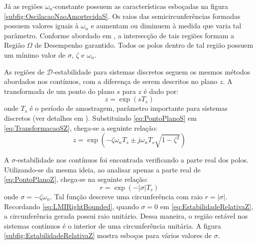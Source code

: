 Já as regiões $\omega_n$-constante possuem as características esboçadas na figura \ref{subfig:OscilacaoNaoAmortecidaS}. Os raios das semicircunferências formadas possuem valores iguais à $\omega_n$ e aumentam ou diminuem à medida que varia tal parâmetro. Conforme abordado em \cite{CHILALI1996}, a intersecção de tais regiões formam a Região $\Omega$ de Desempenho garantido. Todos os polos dentro de tal região possuem um mínimo valor de $\sigma$, $\zeta$ e $\omega_n$.

As regiões de $\mathscr{D}$-estabilidade para sistemas discretos seguem os mesmos métodos abordados nos contínuos, com a diferença de serem descritos no plano $z$. A transformada de um ponto do plano $s$ para $z$ é dado por:
\begin{equation}
  z = \exp(sT_s)\label{eq:TransformacaoSZ}
\end{equation}
onde $T_s$ é o período de amostragem, parâmetro importante para sistemas discretos (ver detalhes em \cite{KUO1980}). Substituindo \eqref{eq:PontoPlanoS} em \eqref{eq:TransformacaoSZ}, chega-se a seguinte relação:
\begin{equation}
  z = \exp{\left(-\zeta\omega_nT_s \pm j\omega_nT_s\sqrt{1-\zeta^2}\right)}\label{eq:PontoPlanoZ}
\end{equation}

A $\sigma$-estabilidade nos contínuos foi encontrada verificando a parte real dos polos. Utilizando-se da mesma ideia, ao analisar apenas a parte real de \eqref{eq:PontoPlanoZ}, chega-se na seguinte relação:
\begin{equation}
  r = \exp{\left(-|\sigma|T_s\right)}\label{eq:EstabilidadeRelativaZ}
\end{equation}
onde $\sigma = -\zeta\omega_n$. Tal função descreve uma circunferência com raio $r = |\sigma|$. Recordando \eqref{eq:LMIRightBounded}, quando $\sigma = 0$ em \eqref{eq:EstabilidadeRelativaZ}, a circunferência gerada possui raio unitário. Dessa maneira, o região estável nos sistemas contínuos é o interior de uma circunferência unitária. A figura \ref{subfig:EstabilidadeRelativaZ} mostra esboços para vários valores de $\sigma$.

